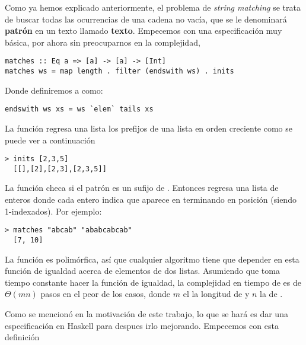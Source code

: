 
Como ya hemos explicado anteriormente, el problema de \textit{string matching} se trata de buscar todas las ocurrencias de una cadena no vacía, que se le denominará \textbf{patrón} en un texto llamado \textbf{texto}.
Empecemos con una especificación muy básica, por ahora sin preocuparnos en la complejidad,

\begin{verbatim}
matches :: Eq a => [a] -> [a] -> [Int]
matches ws = map length . filter (endswith ws) . inits
\end{verbatim}

Donde definiremos a  como:

\begin{verbatim}
endswith ws xs = ws `elem` tails xs
\end{verbatim}

La función  regresa una lista los prefijos de una lista en orden creciente como se puede ver a continuación
\begin{verbatim}
> inits [2,3,5]
  [[],[2],[2,3],[2,3,5]]
\end{verbatim}

La función  checa si el patrón  es un sufijo de .
Entonces  regresa una lista de enteros donde cada entero  indica que  aparece en  terminando en posición  (siendo 1-indexados). Por ejemplo:

\begin{verbatim}
> matches "abcab" "ababcabcab"
  [7, 10]
\end{verbatim}

La función  es polimórfica, así que cualquier algoritmo tiene que depender en esta función de igualdad  acerca de elementos de dos listas.
Asumiendo que toma tiempo constante hacer la función de igualdad, la complejidad en tiempo de  es de $\Theta(mn)$ pasos en el peor de los casos, donde $m$ el la longitud de  y $n$ la de .


Como se mencionó en la motivación de este trabajo, lo que se hará es dar una especificación en Haskell para
despues irlo mejorando. Empecemos con esta definición

